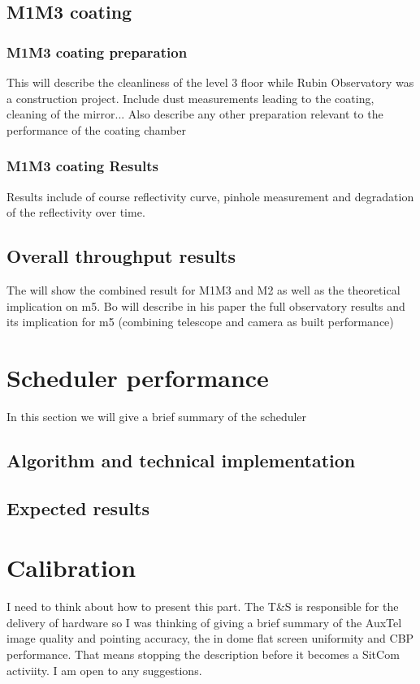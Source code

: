 \subsection{M1M3 coating}
\subsubsection{M1M3 coating preparation}
This will describe the cleanliness of the level 3 floor while Rubin Observatory was a construction project. Include dust measurements leading to the coating, cleaning of the mirror...
Also describe any other preparation relevant to the performance of the coating chamber
\subsubsection{M1M3 coating Results}
Results  include of course reflectivity curve, pinhole measurement and degradation of the reflectivity over time.  

\subsection{Overall throughput results}
The will show the combined result for M1M3 and M2 as well as the theoretical implication on m5. Bo will describe in his paper the full observatory results and its implication for m5 (combining telescope and camera as built performance)

\section{Scheduler performance}
In this section we will  give a brief summary of the scheduler
\subsection{Algorithm and technical implementation}
\subsection{Expected results}

\section{Calibration}
I need to think about how to present this part. The T\&S is responsible for the delivery of hardware so I was thinking of giving a brief summary of the AuxTel  image quality and pointing accuracy, the in dome flat screen uniformity and CBP performance. That means stopping the description before it becomes a SitCom activiity. I am open to any suggestions. 
